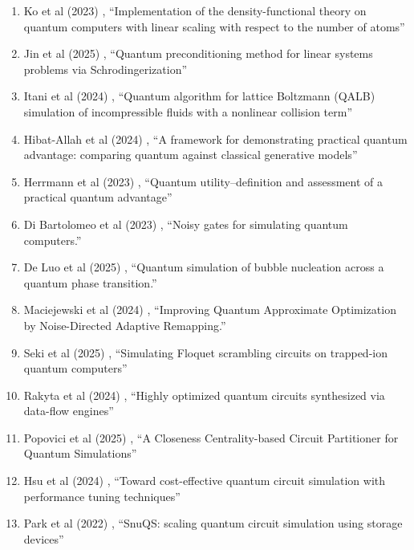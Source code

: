 \documentclass[a4paper,fleqn]{cas-sc}
\begin{document}
\begin{enumerate}
\item Ko et al (2023) \cite{ko2023implementation}, ``Implementation of the density-functional theory on quantum computers with linear scaling with respect to the number of atoms''
\item Jin et al (2025) \cite{jin2025quantum}, ``Quantum preconditioning method for linear systems problems via Schrodingerization''
\item Itani et al (2024) \cite{itani2024quantum}, ``Quantum algorithm for lattice Boltzmann (QALB) simulation of incompressible fluids with a nonlinear collision term''
\item Hibat-Allah et al (2024) \cite{hibat2024framework}, ``A framework for demonstrating practical quantum advantage: comparing quantum against classical generative models''
\item Herrmann et al (2023) \cite{herrmann2023quantum}, ``Quantum utility--definition and assessment of a practical quantum advantage''
\item Di Bartolomeo et al (2023) \cite{di2023noisy}, ``Noisy gates for simulating quantum computers.''
\item De Luo et al (2025) \cite{luo2025quantumsimulationbubblenucleation}, ``Quantum simulation of bubble nucleation across a quantum phase transition.''
\item Maciejewski et al (2024) \cite{maciejewski2024improvingquantumapproximateoptimization}, ``Improving Quantum Approximate Optimization by Noise-Directed Adaptive Remapping.''
\item Seki et al (2025) \cite{PhysRevResearch.7.023032}, ``Simulating Floquet scrambling circuits on trapped-ion quantum computers''
\item Rakyta et al (2024) \cite{rakyta2024highly}, ``Highly optimized quantum circuits synthesized via data-flow engines''
\item Popovici et al (2025) \cite{popovici2025closenesscentralitybasedcircuitpartitioner}, ``A Closeness Centrality-based Circuit Partitioner for Quantum Simulations''
\item Hsu et al (2024) \cite{Hsu31122024}, ``Toward cost-effective quantum circuit simulation with performance tuning techniques''
\item Park et al (2022) \cite{10.1145/3524059.3532375}, ``SnuQS: scaling quantum circuit simulation using storage devices''
\end{enumerate}

\end{document}
